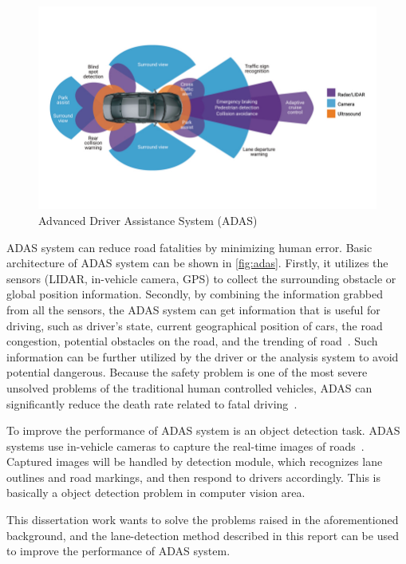 \begin{spacing}{1.5}
\begin{figure}[ht]
\centering
\includegraphics[width=5.5in, fbox]{Chapter1/adas.jpg}
\caption{Advanced Driver Assistance System (ADAS)~\cite{adas}}
\label{fig:adas} 
\end{figure}

ADAS system can reduce road fatalities by minimizing human error. Basic architecture of ADAS system can be shown in \autoref{fig:adas}. Firstly, it utilizes the sensors (LIDAR, in-vehicle camera, GPS) to collect the surrounding obstacle or global position information. Secondly, by combining the information grabbed from all the sensors, the ADAS system can get information that is useful for driving, such as driver's state, current geographical position of cars, the road congestion, potential obstacles on the road, and the trending of road~\cite{morignot2014arbitration}. Such information can be further utilized by the driver or the analysis system to avoid potential dangerous. Because the safety problem is one of the most severe unsolved problems of the traditional human controlled vehicles, ADAS can significantly reduce the death rate related to fatal driving~\cite{brookhuis2001behavioural}.

To improve the performance of ADAS system is an object detection task. ADAS systems use in-vehicle cameras to capture the real-time images of roads~\cite{ziebinski2016survey}. Captured images will be handled by detection module, which recognizes lane outlines and road markings, and then respond to drivers accordingly. This is basically a object detection problem in computer vision area. 

This dissertation work wants to solve the problems raised in the aforementioned background, and the lane-detection method described in this report can be used to improve the performance of ADAS system. 


\end{spacing}
